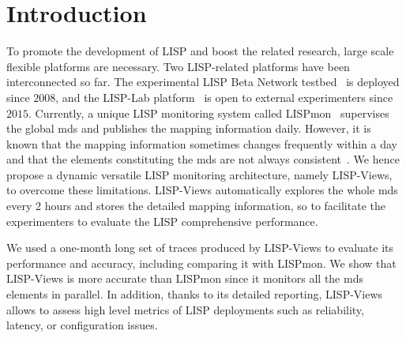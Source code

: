 \section{Introduction}
\label{sec:lispviews_introduction}
To promote the development of LISP and boost the related research, large scale flexible platforms are necessary. Two LISP-related platforms have been interconnected so far. The experimental LISP Beta Network testbed~\cite{lispbeta} is deployed since $2008$, and the LISP-Lab platform~\cite{lisplab} is open to external experimenters since $2015$. Currently, a unique LISP monitoring system called LISPmon~\cite{lispmon} supervises the global \acrshort{mds} and publishes the mapping information daily. However, it is known that the mapping information sometimes changes frequently within a day and that
the elements constituting the \acrshort{mds} are not always
consistent~\cite{yue2016stability}. We hence propose a dynamic versatile LISP
monitoring architecture, namely LISP-Views, to overcome these limitations. LISP-Views
automatically explores the whole \acrshort{mds} every 2 hours and stores the detailed
mapping information, so to facilitate the experimenters to evaluate the LISP
comprehensive performance.

We used a one-month long set of traces produced by LISP-Views to evaluate its performance and accuracy, including comparing it with LISPmon. We show that LISP-Views is more accurate than LISPmon since it monitors all the \acrshort{mds} elements in parallel. In addition, thanks to its detailed reporting, LISP-Views allows to assess high level metrics of LISP deployments such as reliability, latency, or configuration
issues.




